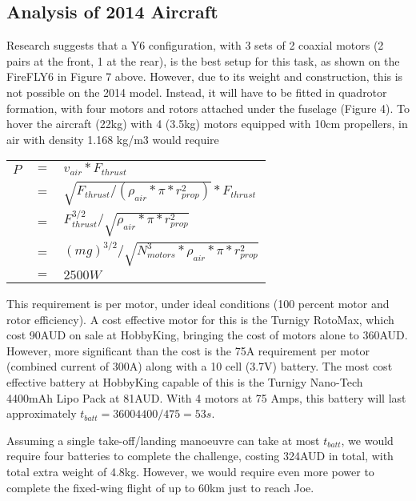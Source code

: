 \label{sec:AppA}

\subsection{Analysis of 2014 Aircraft}
\label{sec:lastYear}
Research suggests that a Y6 configuration, with 3 sets of 2 coaxial motors (2 pairs at the front, 1 at the rear), is the best setup for this task, as shown on the FireFLY6 in Figure 7 above. However, due to its weight and construction, this is not possible on the 2014 model. Instead, it will have to be fitted in quadrotor formation, with four motors and rotors attached under the fuselage (Figure 4). To hover the aircraft (22kg) with 4 (3.5kg) motors equipped with 10cm propellers, in air with density 1.168 kg/m3 would require\\

\begin{tabular}{r c l}
	$P$ & $=$ & $v_{air}*F_{thrust}$\\
	& $=$ & $\sqrt{F_{thrust}/(\rho_{air}*\pi*r_{prop}^2)}*F_{thrust}$\\
	& $=$ & $F_{thrust}^{3/2}/\sqrt{\rho_{air}*\pi*r_{prop}^2}$\\
	& $=$ & $(mg)^{3/2}/\sqrt{N_{motors}^3*\rho_{air}*\pi*r_{prop}^2}$\\
	& $=$ & $2500W$\\
\end{tabular}
\vspace{6pt}
	
This requirement is per motor, under ideal conditions (100 percent motor and rotor efficiency). A cost effective motor for this is the Turnigy RotoMax, which cost 90AUD on sale at HobbyKing, bringing the cost of motors alone to 360AUD. However, more significant than the cost is the 75A requirement per motor (combined current of 300A) along with a 10 cell (3.7V) battery.  The most cost effective battery at HobbyKing capable of this is the Turnigy Nano-Tech 4400mAh Lipo Pack at 81AUD. \color{red} With 4 motors at 75 Amps, this battery will last approximately $t_{batt}=36004400/475=53s$. \color{black}\\
	
Assuming a single take-off/landing manoeuvre can take at most $t_{batt}$, we would require four batteries to complete the challenge, costing 324AUD in total, with total extra weight of 4.8kg. However, we would require even more power to complete the fixed-wing flight of up to 60km just to reach Joe.\\
	
